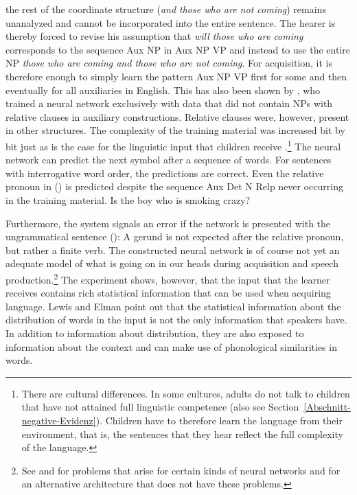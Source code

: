 the rest of the coordinate structure (\emph{and those who are not coming}) remains unanalyzed and cannot be incorporated into the entire sentence.
The hearer is thereby forced to revise his assumption that \emph{will those who are coming} corresponds to the sequence Aux NP in Aux NP VP and instead to
use the entire NP \emph{those who are coming and those who are not coming}.
For acquisition, it is therefore enough to simply learn the pattern Aux NP VP first for some and then eventually for all auxiliaries in English.
This has also been shown by \citet{LE2001a}, who trained a neural network exclusively with data that did not contain NPs with relative
clauses in auxiliary constructions. Relative clauses were, however, present in other structures. The complexity of the training material was increased bit
by bit just as is the case for the linguistic input that children receive
\citep{Elman93a}.\footnote{%
	There are cultural differences. In some cultures, adults do not talk to children that have not attained
	full linguistic competence \citep{Ochs82a,OS85a} (also see
  Section~\ref{Abschnitt-negative-Evidenz}). Children have to therefore learn the language from their environment, that is, the sentences that
  they hear reflect the full complexity of the language.
} The neural network can predict the next symbol after a sequence of words. For sentences with interrogative word order, the predictions are correct.
Even the relative pronoun in () is predicted despite the sequence Aux Det N Relp never occurring in the training material.
\ea
Is the boy who is smoking crazy?
\z

\noindent
Furthermore, the system signals an error if the network is presented with the ungrammatical sentence ():
\z
A gerund is not expected after the relative pronoun, but rather a finite verb. The constructed neural network is of course not yet an adequate model of what is
going on in our heads during acquisition and speech production.\footnote{%
  See \citet[]{Hurford2002a} and \citet[Section~6.2]{Jackendoff2007a} for problems that arise for certain kinds of neural
  networks and \citet{Pulvermueller2003a,Pulvermueller2010a} for an alternative
  architecture that does not have these problems.
} The experiment shows, however, that the input that the learner receives contains rich statistical information that can be
used when acquiring language. Lewis and Elman point out that the statistical information about the distribution of words in the input
is not the only information that speakers have. In addition to information about distribution, they are also exposed to information about the context
and can make use of phonological similarities in words.

